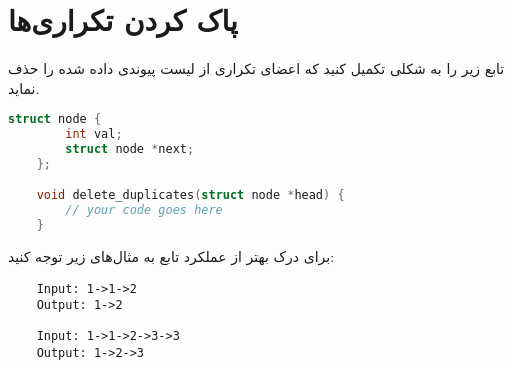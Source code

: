 \documentclass[../main.tex]{subfiles}
\begin{document}
\section{پاک کردن تکراری‌ها}
\paragraph{}
تابع زیر را به شکلی تکمیل کنید که اعضای تکراری از لیست پیوندی داده شده را حذف نماید.

\begin{latin}
\begin{lstlisting}[language=c]
    struct node {
        int val;
        struct node *next;
    };

    void delete_duplicates(struct node *head) {
        // your code goes here
    }
\end{lstlisting}
\end{latin}

برای درک بهتر از عملکرد تابع به مثال‌های زیر توجه کنید:

\begin{latin}
\begin{verbatim}
    Input: 1->1->2
    Output: 1->2
\end{verbatim}

\begin{verbatim}
    Input: 1->1->2->3->3
    Output: 1->2->3
\end{verbatim}
\end{latin}
\end{document}
